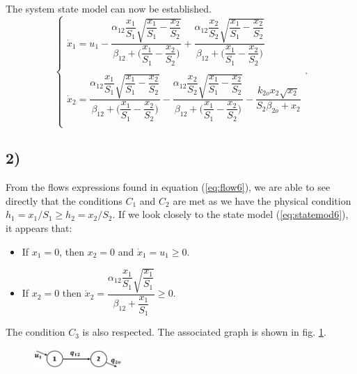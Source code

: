 The system state model can now be established.
\begin{equation}
\left\{
  \begin{array}{l}
  \dot{x}_1=u_1-\dfrac{\alpha_{12}\dfrac{x_1}{S_1}\sqrt{\dfrac{x_1}{S_1}-\dfrac{x_2}{S_2}}}{\beta_{12}+\Big(\dfrac{x_1}{S_1}-\dfrac{x_2}{S_2}\Big)}+\dfrac{\alpha_{12}\dfrac{x_2}{S_2}\sqrt{\dfrac{x_1}{S_1}-\dfrac{x_2}{S_2}}}{\beta_{12}+\Big(\dfrac{x_1}{S_1}-\dfrac{x_2}{S_2}\Big)} \\
  \\
  \dot{x}_2=\dfrac{\alpha_{12}\dfrac{x_1}{S_1}\sqrt{\dfrac{x_1}{S_1}-\dfrac{x_2}{S_2}}}{\beta_{12}+\Big(\dfrac{x_1}{S_1}-\dfrac{x_2}{S_2}\Big)}-\dfrac{\alpha_{12}\dfrac{x_2}{S_2}\sqrt{\dfrac{x_1}{S_1}-\dfrac{x_2}{S_2}}}{\beta_{12}+\Big(\dfrac{x_1}{S_1}-\dfrac{x_2}{S_2}\Big)}-\dfrac{k_{2o}x_2\sqrt{x_2}}{S_2\beta_{2o}+x_2}\\
  \end{array} \right..
\label{eq:statemod6}
\end{equation}

\subsection*{2)}
From the flows expressions found in equation (\ref{eq:flow6}), we are able to see directly that the conditions $C_1$ and $C_2$ are met as we have the physical condition $h_1=x_1/S_1 \geq h_2 = x_2/S_2$. If we look closely to the state model (\ref{eq:statemod6}), it appears that:
\begin{itemize}
\item If $x_1=0$, then $x_2 =0$ and $\dot{x}_1=u_1\geq 0$.
\item If $x_2=0$ then $\dot{x}_2=\dfrac{\alpha_{12}\dfrac{x_1}{S_1}\sqrt{\dfrac{x_1}{S_1}}}{\beta_{12}+\dfrac{x_1}{S_1}}\geq 0$.
\end{itemize}
The condition $C_3$ is also respected. The associated graph is shown in fig. \ref{graph6}.\\

\begin{figure}[h!]
  \centering
  \includegraphics[width=0.3\textwidth]{graph6}
  \caption{}
  \label{graph6}
\end{figure}
